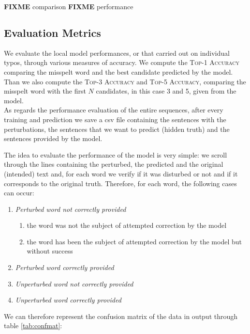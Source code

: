 \textbf{FIXME} comparison
\textbf{FIXME} performance

\subsection{Evaluation Metrics}
We evaluate the local model performances, or that carried out on individual typos, through various measures of 
accuracy. 
We compute the \textsc{Top-1 Accuracy} comparing the misspelt word and the best candidate predicted by the 
model. 
Than we also compute the \textsc{Top-3 Accuracy} and \textsc{Top-5 Accuracy}, comparing the misspelt word 
with the first $N$ candidates, in this case \num{3} and \num{5}, given from the model.\\


As regards the performance evaluation of the entire sequences, after every training and prediction we save a csv 
file containing the sentences with the perturbations, the sentences that we want to predict (hidden truth) and the 
sentences provided by the model.

The idea to evaluate the performance of the model is very simple: we scroll through the lines containing the 
perturbed, the predicted and the original (intended) text and, for each word we verify if it was disturbed or not and 
if it corresponds to the original truth.
Therefore, for each word, the following cases can occur:
\begin{enumerate}
	\item \textit{Perturbed word not correctly provided}
	\begin{enumerate}
		\item the word was not the subject of attempted correction by the model
		\item the word has been the subject of attempted correction by the model but without success
	\end{enumerate}
	\item \textit{Perturbed word correctly provided}
	\item \textit{Unperturbed word not correctly provided}
	\item \textit{Unperturbed word correctly provided}
\end{enumerate}

We can therefore represent the confusion matrix of the data in output through table \ref{tab:confmat}:


